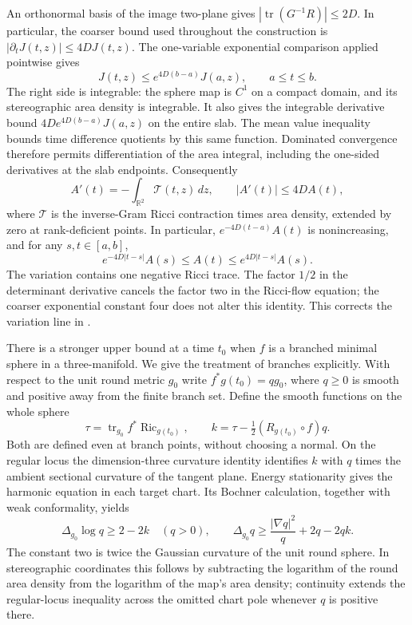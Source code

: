 An orthonormal basis of the image two-plane gives
$|\operatorname{tr}(G^{-1}R)|\leq2D$. In particular, the coarser bound
used throughout the construction is
$|\partial_t J(t,z)|\leq4D J(t,z)$. The one-variable exponential
comparison applied pointwise gives
\[
 J(t,z)\leq e^{4D(b-a)}J(a,z),\qquad a\leq t\leq b.
\]
The right side is integrable: the sphere map is $C^1$ on a compact
domain, and its stereographic area density is integrable. It also gives
the integrable derivative bound
$4D e^{4D(b-a)}J(a,z)$ on the entire slab. The mean value inequality
bounds time difference quotients by this same function. Dominated
convergence therefore permits differentiation of the area integral,
including the one-sided derivatives at the slab endpoints. Consequently
\[
 A'(t)=-\int_{\mathbb R^2}\mathcal T(t,z)\,dz,
 \qquad |A'(t)|\leq4D A(t),
\]
where $\mathcal T$ is the inverse-Gram Ricci contraction times area
density, extended by zero at rank-deficient points. In particular,
$e^{-4D(t-a)}A(t)$ is nonincreasing, and for any $s,t\in[a,b]$,
\[
 e^{-4D|t-s|}A(s)\leq A(t)\leq e^{4D|t-s|}A(s).
\]
The variation contains one negative Ricci trace. The factor $1/2$ in
the determinant derivative cancels the factor two in the Ricci-flow
equation; the coarser exponential constant four does not alter this
identity. This corrects the variation line in
\cite[Claim 18.13, p.~427]{MT2007}.

There is a stronger upper bound at a time $t_0$ when $f$ is a branched
minimal sphere in a three-manifold. We give the treatment of branches
explicitly. With respect to the unit round metric $g_0$ write
$f^*g(t_0)=qg_0$, where $q\geq0$ is smooth and positive away from the
finite branch set. Define the smooth functions on the whole sphere
\[
 \tau=\operatorname{tr}_{g_0}f^*\operatorname{Ric}_{g(t_0)},\qquad
 k=\tau-\tfrac12(R_{g(t_0)}\circ f)q.
\]
Both are defined even at branch points, without choosing a normal.
On the regular locus the dimension-three curvature identity identifies
$k$ with $q$ times the ambient sectional curvature of the tangent plane.
Energy stationarity gives the harmonic equation in each target chart.
Its Bochner calculation, together with weak conformality, yields
\[
 \Delta_{g_0}\log q\geq2-2k\quad(q>0),
 \qquad
 \Delta_{g_0}q\geq\frac{|\nabla q|^2}{q}+2q-2qk.
\]
The constant two is twice the Gaussian curvature of the unit round
sphere. In stereographic coordinates this follows by subtracting the
logarithm of the round area density from the logarithm of the map's
area density; continuity extends the regular-locus inequality across
the omitted chart pole whenever $q$ is positive there.

